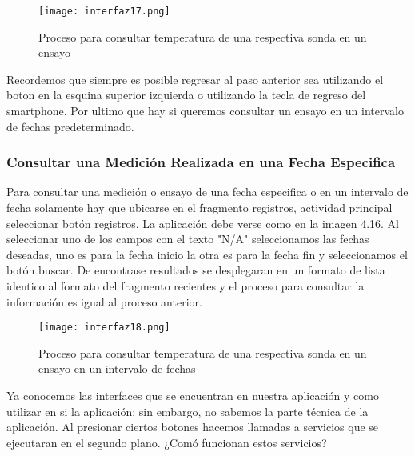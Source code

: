 \begin{figure}[H]
	\centering
	\texttt{[image: interfaz17.png]}
	\caption{Proceso para consultar temperatura de una respectiva sonda en un ensayo}
\end{figure}

\par \noindent
Recordemos que siempre es posible regresar al paso anterior sea utilizando el boton en la esquina superior izquierda o utilizando la tecla de regreso del smartphone. Por ultimo que hay si queremos consultar un ensayo en un intervalo de fechas predeterminado. 

\clearpage

\subsubsection{Consultar una Medición Realizada en una Fecha Especifica}

\par 
Para consultar una medición o ensayo de una fecha especifica o en un intervalo de fecha solamente hay que ubicarse en el fragmento registros, actividad principal seleccionar botón registros. La aplicación debe verse como en la imagen 4.16. Al seleccionar uno de los campos con el texto "N/A" seleccionamos las fechas deseadas, uno es para la fecha inicio la otra es para la fecha fin y seleccionamos el botón buscar. De encontrase resultados se desplegaran en un formato de lista identico al formato del fragmento recientes y el proceso para consultar la información es igual al proceso anterior.

\begin{figure}[H]
	\centering
	\texttt{[image: interfaz18.png]}
	\caption{Proceso para consultar temperatura de una respectiva sonda en un ensayo en un intervalo de fechas}
\end{figure}

\par \noindent
Ya conocemos las interfaces que se encuentran en nuestra aplicación y como utilizar en si la aplicación; sin embargo, no sabemos la parte técnica de la aplicación. Al presionar ciertos botones hacemos llamadas a servicios que se ejecutaran en el segundo plano. ¿Comó funcionan estos servicios?




